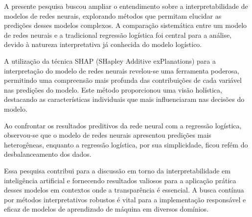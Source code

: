 A presente pesquisa buscou ampliar o entendimento sobre a interpretabilidade de modelos de redes neurais, 
explorando métodos que permitam elucidar as predições desses modelos complexos. A comparação sistemática 
entre um modelo de redes neurais e a tradicional regressão logística foi central para a análise, devido à natureza
interpretativa já conhecida do modelo logístico.

A utilização da técnica SHAP (SHapley Additive exPlanations) para a interpretação do modelo de redes neurais 
revelou-se uma ferramenta poderosa, permitindo uma compreensão mais profunda das contribuições de cada variável
nas predições do modelo. Este método proporcionou uma visão holística, destacando as características individuais
que mais influenciaram nas decisões do modelo.

Ao confrontar os resultados preditivos da rede neural com a regressão logística, observou-se que o modelo de redes neurais
apresentou predições mais heterogêneas, enquanto a regressão logística, por sua simplicidade, ficou refém do 
desbalanceamento dos dados. 

Essa pesquisa contribui para a discussão em torno da interpretabilidade em inteligência
artificial e fornecendo resultados valiosos para a aplicação prática desses modelos em contextos onde a transparência é 
essencial. A busca contínua por métodos interpretativos robustos é vital para a implementação responsável e eficaz 
de modelos de aprendizado de máquina em diversos domínios.